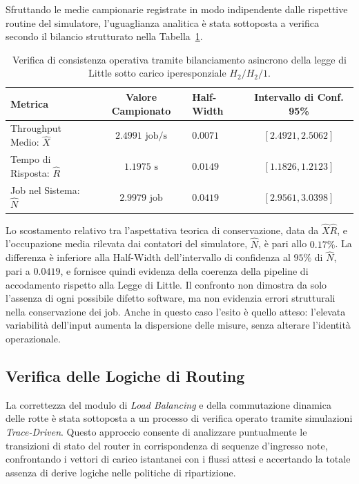 ﻿\documentclass[a4paper,12pt]{article}
\begin{document}
Sfruttando le medie campionarie registrate in modo indipendente dalle rispettive routine del simulatore, l'uguaglianza analitica è stata sottoposta a verifica secondo il bilancio strutturato nella Tabella~\ref{tab:littles_law}.

\begin{table}[htbp]
    \centering
    \small
    \renewcommand{\arraystretch}{1.3}
    \begin{tabular}{lclc}
        \hline
        \textbf{Metrica} & \textbf{Valore Campionato} & \textbf{Half-Width} & \textbf{Intervallo di Conf. 95\%} \\ \hline
        Throughput Medio: $\hat{X}$      & $2.4991\text{ job/s}$    & $0.0071$      & $[2.4921, 2.5062]$        \\
        Tempo di Risposta: $\hat{R}$     & $1.1975\text{ s}$        & $0.0149$      & $[1.1826, 1.2123]$        \\
        Job nel Sistema: $\hat{N}$       & $2.9979\text{ job}$      & $0.0419$      & $[2.9561, 3.0398]$        \\ \hline
    \end{tabular}
    \caption{Verifica di consistenza operativa tramite bilanciamento asincrono della legge di Little sotto carico iperesponziale $H_2/H_2/1$.}
    \label{tab:littles_law}
\end{table}

Lo scostamento relativo tra l'aspettativa teorica di conservazione, data da $\hat{X}\hat{R}$, e l'occupazione media rilevata dai contatori del simulatore, $\hat{N}$, è pari allo $0.17\%$. La differenza è inferiore alla Half-Width dell'intervallo di confidenza al $95\%$ di $\hat{N}$, pari a $0.0419$, e fornisce quindi evidenza della coerenza della pipeline di accodamento rispetto alla Legge di Little. Il confronto non dimostra da solo l'assenza di ogni possibile difetto software, ma non evidenzia errori strutturali nella conservazione dei job. Anche in questo caso l'esito è quello atteso: l'elevata variabilità dell'input aumenta la dispersione delle misure, senza alterare l'identità operazionale.


\subsection{Verifica delle Logiche di Routing}
La correttezza del modulo di \textit{Load Balancing} e della commutazione dinamica delle rotte è stata sottoposta a un processo di verifica operato tramite simulazioni \textit{Trace-Driven}. Questo approccio consente di analizzare puntualmente le transizioni di stato del router in corrispondenza di sequenze d'ingresso note, confrontando i vettori di carico istantanei con i flussi attesi e accertando la totale assenza di derive logiche nelle politiche di ripartizione.
\end{document}
